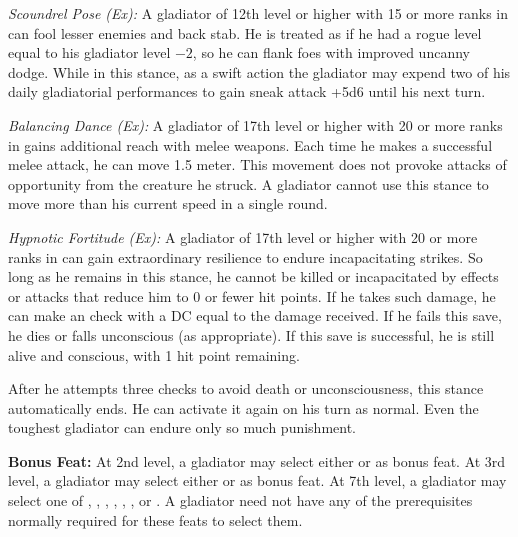 \textit{Scoundrel Pose (Ex):} A gladiator of 12th level or higher with 15 or more ranks in  can fool lesser enemies and back stab. He is treated as if he had a rogue level equal to his gladiator level $-2$, so he can flank foes with improved uncanny dodge. While in this stance, as a swift action the gladiator may expend two of his daily gladiatorial performances to gain sneak attack +5d6 until his next turn.


\textit{Balancing Dance (Ex):} A gladiator of 17th level or higher with 20 or more ranks in  gains additional reach with melee weapons. Each time he makes a successful melee attack, he can move 1.5 meter. This movement does not provoke attacks of opportunity from the creature he struck. A gladiator cannot use this stance to move more than his current speed in a single round.

\textit{Hypnotic Fortitude (Ex):} A gladiator of 17th level or higher with 20 or more ranks in  can gain extraordinary resilience to endure incapacitating strikes. So long as he remains in this stance, he cannot be killed or incapacitated by effects or attacks that reduce him to 0 or fewer hit points. If he takes such damage, he can make an  check with a DC equal to the damage received. If he fails this save, he dies or falls unconscious (as appropriate). If this save is successful, he is still alive and conscious, with 1 hit point remaining.

After he attempts three  checks to avoid death or unconsciousness, this stance automatically ends. He can activate it again on his turn as normal. Even the toughest gladiator can endure only so much punishment.

\textbf{Bonus Feat:} At 2nd level, a gladiator may select either  or  as bonus feat. At 3rd level, a gladiator may select either  or  as bonus feat. At 7th level, a gladiator may select one of , , , , , , or . A gladiator need not have any of the prerequisites normally required for these feats to select them.

